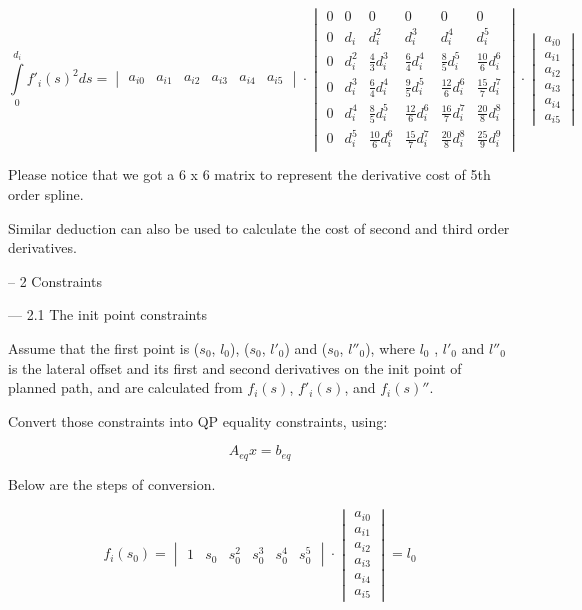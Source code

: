 \documentclass[a4paper,11pt]{article}  %
\begin{document}
$$
\int\limits_{0}^{d_i} 
f'_i(s)^2 ds =\begin{vmatrix} a_{i0} & a_{i1} & a_{i2} & a_{i3} & a_{i4} & a_{i5} \end{vmatrix} 
\cdot \begin{vmatrix} 
0 & 0 & 0 & 0 &0&0\\ 
0 & d_i & d_i^2 & d_i^3 & d_i^4&d_i^5\\
0& d_i^2 & \frac{4}{3}d_i^3& \frac{6}{4}d_i^4 & \frac{8}{5}d_i^5&\frac{10}{6}d_i^6\\
0& d_i^3 & \frac{6}{4}d_i^4 & \frac{9}{5}d_i^5 & \frac{12}{6}d_i^6&\frac{15}{7}d_i^7\\
0& d_i^4 & \frac{8}{5}d_i^5 & \frac{12}{6}d_i^6 & \frac{16}{7}d_i^7&\frac{20}{8}d_i^8\\
0& d_i^5 & \frac{10}{6}d_i^6 & \frac{15}{7}d_i^7 & \frac{20}{8}d_i^8&\frac{25}{9}d_i^9
\end{vmatrix} 
\cdot 
\begin{vmatrix} a_{i0} \\ a_{i1} \\ a_{i2} \\ a_{i3} \\ a_{i4} \\ a_{i5} \end{vmatrix}
$$


Please notice that we got a 6 x 6 matrix to represent the derivative cost of 5th order spline.



Similar deduction can also be used to calculate the cost of second and third order derivatives.



-- 2  Constraints  

--- 2.1  The init point constraints

Assume that the first point is ($s_0$, $l_0$), ($s_0$, $l'_0$) and ($s_0$, $l''_0$), where $l_0$ , $l'_0$ and $l''_0$ is the lateral offset and its first and second derivatives on the init point of planned path, and are calculated from $f_i(s)$, $f'_i(s)$, and $f_i(s)''$.  

Convert those constraints into QP equality constraints, using: 

$$
A_{eq}x = b_{eq}
$$

Below are the steps of conversion.

$$
f_i(s_0) = 
\begin{vmatrix} 1 & s_0 & s_0^2 & s_0^3 & s_0^4&s_0^5 \end{vmatrix} 
\cdot 
\begin{vmatrix}  a_{i0} \\ a_{i1} \\ a_{i2} \\ a_{i3} \\ a_{i4} \\ a_{i5}\end{vmatrix} = l_0
$$
\end{document}
